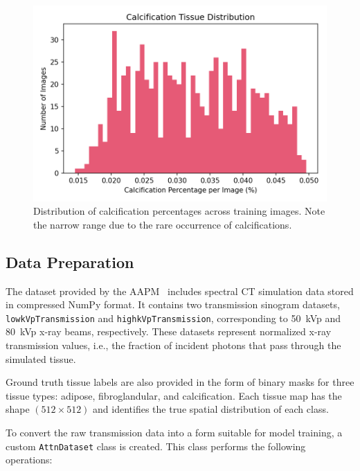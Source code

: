 \begin{figure}[h!]
    \centering
    \includegraphics[width=\linewidth]{./fig/calcification_distribution.png}
    \caption{Distribution of calcification percentages across training images. Note the narrow range due to the rare occurrence of calcifications.}
    \label{fig:calcification}
\end{figure}



\subsection{Data Preparation}\label{sec:data_preparation}

The dataset provided by the AAPM~\cite{AAPM2024SpectralCT} includes spectral CT simulation data stored 
in compressed NumPy format. It contains two transmission sinogram datasets, \texttt{lowkVpTransmission} 
and \newline \texttt{highkVpTransmission}, corresponding to 50~kVp and 80~kVp x-ray beams, respectively. These 
datasets represent normalized x-ray transmission values, i.e., the fraction of incident photons that 
pass through the simulated tissue.

Ground truth tissue labels are also provided in the form of binary masks for three tissue types: adipose, 
fibroglandular, and calcification. Each tissue map has the shape $(512 \times 512)$ and identifies the 
true spatial distribution of each class.

To convert the raw transmission data into a form suitable for model training, a custom \texttt{AttnDataset} 
class is created. This class performs the following operations:

